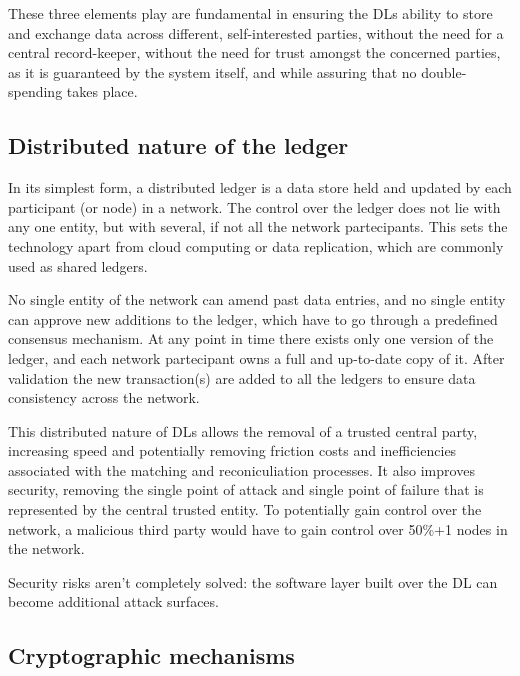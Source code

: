 These three elements play are fundamental in ensuring the DLs ability to store and exchange data across different, self-interested parties, without the need for a central record-keeper, without the need for trust amongst the concerned parties, as it is guaranteed by the system itself, and while assuring that no double-spending takes place.

\subsection{Distributed nature of the ledger}
In its simplest form, a distributed ledger is a data store held and updated by each participant (or node) in a network. The control over the ledger does not lie with any one entity, but with several, if not all the network partecipants. This sets the technology apart from cloud computing or data replication, which are commonly used as shared ledgers.

No single entity of the network can amend past data entries, and no single entity can approve new additions to the ledger, which have to go through a predefined consensus mechanism. At any point in time there exists only one version of the ledger, and each network partecipant owns a full and up-to-date copy of it.
After validation the new transaction(s) are added to all the ledgers to ensure data consistency across the network.

This distributed nature of DLs allows the removal of a trusted central party, increasing speed and potentially removing friction costs and inefficiencies associated with the matching and reconiculiation processes. It also improves security, removing the single point of attack and single point of failure that is represented by the central trusted entity. To potentially gain control over the network, a malicious third party would have to gain control over 50\%+1 nodes in the network. 

Security risks aren't completely solved: the software layer built over the DL can become additional attack surfaces.

\subsection{Cryptographic mechanisms}

